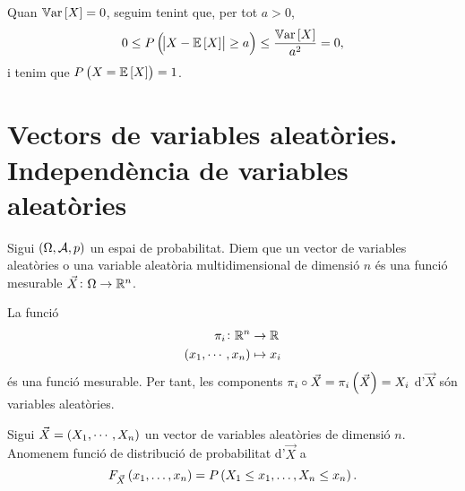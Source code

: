 \begin{obs}
    Quan $\operatorname{\mathbb{V}ar}\left[ X\right]=0$, seguim tenint que, per tot $a>0$,
    \[
        0\leq P\left(\abs{X-\operatorname{\mathbb{E}}\left[ X\right]} \geq a\right)\leq \frac{\operatorname{\mathbb{V}ar}\left[ X\right]}{a^2} =0,
    \]
    i tenim que $P\left( X=\operatorname{\mathbb{E}}\left[ X\right]\right)=1$.
\end{obs}

\section[Vectors de variables aleatòries. Independència de variables aleatòries]
    {Vectors de variables aleatòries. Independència de variables aleatòries
    }

\begin{defi}
    Sigui $\left(\Omega,\mathcal{A},p\right)$ un espai de probabilitat. Diem que un vector de variables aleatòries o una variable aleatòria multidimensional de dimensió $n$ és una funció mesurable $\vec{X}\colon\Omega\to\mathbb{R}^n$.
\end{defi}
\begin{obs}
    La funció 
    \begin{align*}
        \pi_i\colon\mathbb{R}^n &\to\mathbb{R}\\
        \left( x_1,\cdots,x_n\right) &\mapsto x_i
    \end{align*}
    és una funció mesurable. Per tant, les components $\pi_i\circ\vec{X}=\pi_i\left(\vec{X}\right)=X_i$ d'$\vec{X}$ són variables aleatòries.
\end{obs}
\begin{defi}
    Sigui $\vec{X}=\left( X_1,\cdots, X_n\right)$ un vector de variables aleatòries de dimensió $n$. Anomenem funció de distribució de probabilitat d'$\vec{X}$ a 
    \[
        F_{\vec{X}}\left( x_1,\dots,x_n\right) = P\left( X_1\leq x_1,\dots, X_n\leq x_n\right).
    \]
\end{defi}
